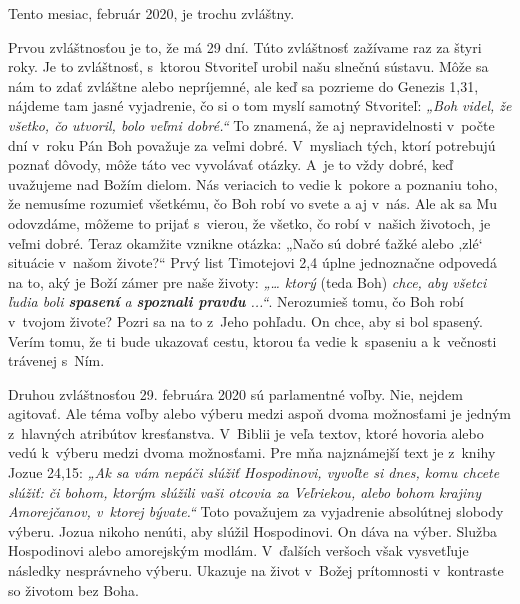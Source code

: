 


Tento mesiac, február 2020, je trochu zvláštny.

Prvou zvláštnosťou je to, že má 29 dní. Túto zvláštnosť zažívame raz za štyri roky. Je to zvláštnosť, s~ktorou Stvoriteľ urobil našu slnečnú sústavu. Môže sa nám to zdať zvláštne alebo nepríjemné, ale keď sa pozrieme do Genezis 1,31, nájdeme tam jasné vyjadrenie, čo si o tom myslí samotný Stvoriteľ: {\it  „Boh videl, že všetko, čo utvoril, bolo veľmi dobré.“} To znamená, že aj nepravidelnosti v~počte dní v~roku Pán Boh považuje za veľmi dobré. V~mysliach tých, ktorí potrebujú poznať dôvody, môže táto vec vyvolávať otázky. A~je to vždy dobré, keď uvažujeme nad Božím dielom. Nás veriacich to vedie k~pokore a poznaniu toho, že nemusíme rozumieť všetkému, čo Boh robí vo svete a aj v~nás. Ale ak sa Mu odovzdáme, môžeme to prijať s~vierou, že všetko, čo robí v~našich životoch, je veľmi dobré. Teraz okamžite vznikne otázka: „Načo sú dobré ťažké alebo ‚zlé‘ situácie v~našom živote?“ Prvý list Timotejovi 2,4 úplne jednoznačne odpovedá na to, aký je Boží zámer pre naše životy: {\it „… ktorý} (teda Boh) {{\it chce, aby všetci ľudia boli {\bf spasení} a {\bf spoznali pravdu} ...“}}. Nerozumieš tomu, čo Boh robí v~tvojom živote? Pozri sa na to z~Jeho pohľadu. On chce, aby si bol spasený. Verím tomu, že ti bude ukazovať cestu, ktorou ťa vedie k~spaseniu a k~večnosti trávenej s~Ním.

Druhou zvláštnosťou 29. februára 2020 sú parlamentné voľby. Nie, nejdem agitovať. Ale téma voľby alebo výberu medzi aspoň dvoma možnosťami je jedným z~hlavných atribútov kresťanstva. V~Biblii je veľa textov, ktoré hovoria alebo vedú k~výberu medzi dvoma možnosťami. Pre mňa najznámejší text je z~knihy Jozue 24,15:  {\it „Ak sa vám nepáči slúžiť Hospodinovi, vyvoľte si dnes, komu chcete slúžiť: či bohom, ktorým slúžili vaši otcovia za Veľriekou, alebo bohom krajiny Amorejčanov, v~ktorej bývate.“} Toto považujem za vyjadrenie absolútnej slobody výberu. Jozua nikoho nenúti, aby slúžil Hospodinovi. On dáva na výber. Služba Hospodinovi alebo amorejským modlám. V~ďalších veršoch však vysvetľuje následky nesprávneho výberu. Ukazuje na život v~Božej prítomnosti v~kontraste so životom bez Boha.


